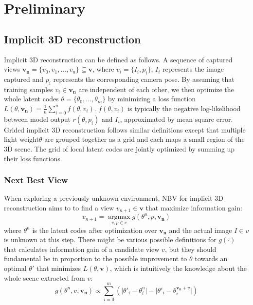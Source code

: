 \section*{Preliminary}
\subsection{Implicit 3D reconstruction}
Implicit 3D reconstruction can be defined as follows. 
A sequence of captured views $\bm{v_n}=\{v_0, v_1, ..., v_n\} \subseteq \bm{v}$, where $v_i=\{I_i,p_i\}$, $I_i$ represents the image captured and $p_i$ represents the corresponding camera pose.
By assuming that training samples $v_i \in \bm{v_n}$ are independent of each other, we then optimize the whole latent codes $\theta=\{\theta_0,...,\theta_m\}$ by minimizing a loss function $L(\theta, \bm{v_n}) = \frac{1}{n}\sum_{i=0}^{n} f(\theta, v_i)$.
$f(\theta, v_i)$ is typically the negative log-likelihood between model output $r(\theta, p_i)$ and $I_i$, approximated by mean square error.
Grided implicit 3D reconstruction follows similar definitions except that multiple light weight$\theta$ are grouped together as a grid and each maps a small region of the 3D scene.
The grid of local latent codes are jointly optimized by summing up their loss functions.

\subsubsection{Next Best View}
When exploring a previously unknown environment, NBV for implicit 3D reconstruction aims to to find a view $v_{n+1}\in\bm{v}$ that maximize information gain:
\begin{equation}
    v_{n+1} = \mathop{\arg\max}\limits_{v,p\in v} g(\theta^n, p, \bm{v_n})
    \label{nbv2}
\end{equation}
where $\theta^n$ is the latent codes after optimization over $\bm{v_n}$ and the actual image $I\in v$ is unknown at this step.
There might be various possible definitions for $g(\cdot)$ that calculates information gain of a candidate view $v$, but they should fundamental be in proportion to the possible improvement to $\theta$ towards an optimal $\theta'$ that minimizes $L(\theta, \bm{v})$, which is intuitively the knowledge about the whole scene extracted from $v$:
\begin{equation}
    g(\theta^n, v, \bm{v_n}) \propto \sum_{i=0}^{m}(\lvert\theta'_i - \theta_i^n\rvert - \lvert \theta'_i - \theta_i^{\bm{v_n} + v}\rvert)
    \label{gain}
\end{equation}

